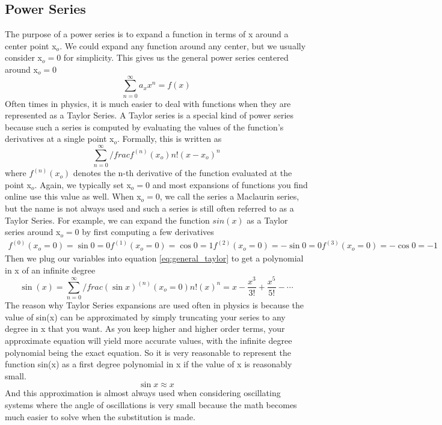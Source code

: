 \documentclass{article}
\newcommand{\be}{\begin{equation}}
\newcommand{\ee}{\end{equation}}
\newcommand{\sumzero}{\sum_{n=0}^\infty}
\begin{document}
\subsection*{Power Series}
The purpose of a power series is to expand a function in terms of x around a center point x$_o$.
We could expand any function around any center, but we usually consider x$_o = 0$ for simplicity.
This gives us the general power series centered around x$_o = 0$
\be
\sumzero a_x x^n = f(x)
\ee
Often times in physics, it is much easier to deal with functions when they are represented as a Taylor Series.
A Taylor series is a special kind of power series because such a series is computed by evaluating the values of the function's derivatives at a single point x$_o$.
Formally, this is written as
\be \label{eq:general_taylor}
\sumzero /frac{f^{(n)} (x_o)}{n!} (x - x_o)^n
\ee
where $f^{(n)} (x_o)$ denotes the n-th derivative of the function evaluated at the point x$_o$.
Again, we typically set x$_o = 0$ and most expansions of functions you find online use this value as well.
When x$_o = 0$, we call the series a Maclaurin series, but the name is not always used and such a series is still often referred to as a Taylor Series.
For example, we can expand the function $sin(x)$ as a Taylor series around x$_o = 0$ by first computing a few derivatives
\be
\begin{split}
f^{(0)} (x_o = 0) = \sin{0} = 0
f^{(1)} (x_o = 0) = \cos{0} = 1
f^{(2)} (x_o = 0) = - \sin{0} = 0
f^{(3)} (x_o = 0) = - \cos{0} = -1
\end{split}
\ee
Then we plug our variables into equation \ref{eq:general_taylor} to get a polynomial in x of an infinite degree
\be
\sin(x) = \sumzero /frac{(\sin{x})^{(n)} (x_o = 0)}{n!} (x)^n = x - \frac{x^3}{3!} + \frac{x^5}{5!} - \cdots
\ee
The reason why Taylor Series expansions are used often in physics is because the value of sin(x) can be approximated by simply truncating your series to any degree in x that you want.
As you keep higher and higher order terms, your approximate equation will yield more accurate values, with the infinite degree polynomial being the exact equation.
So it is very reasonable to represent the function sin(x) as a first degree polynomial in x if the value of x is reasonably small.
\be
\sin{x} \approx x
\ee
And this approximation is almost always used when considering oscillating systems where the angle of oscillations is very small because the math becomes much easier to solve when the substitution is made.
\end{document}
